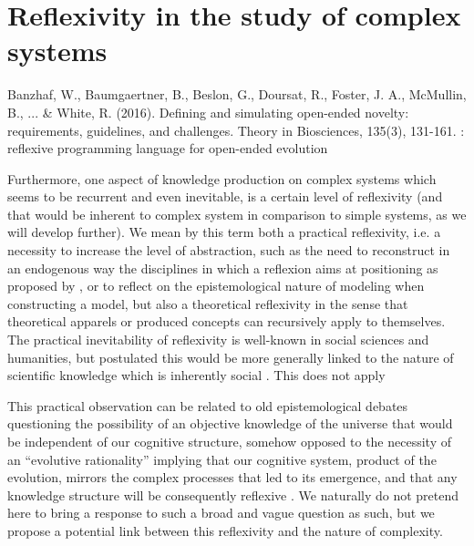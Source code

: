 


\section{Reflexivity in the study of complex systems}


Banzhaf, W., Baumgaertner, B., Beslon, G., Doursat, R., Foster, J. A., McMullin, B., ... & White, R. (2016). Defining and simulating open-ended novelty: requirements, guidelines, and challenges. Theory in Biosciences, 135(3), 131-161. : reflexive programming language for open-ended evolution


Furthermore, one aspect of knowledge production on complex systems which seems to be recurrent and even inevitable, is a certain level of reflexivity (and that would be inherent to complex system in comparison to simple systems, as we will develop further). We mean by this term both a practical reflexivity, i.e. a necessity to increase the level of abstraction, such as the need to reconstruct in an endogenous way the disciplines in which a reflexion aims at positioning as proposed by \cite{2017arXiv171200805R}, or to reflect on the epistemological nature of modeling when constructing a model, but also a theoretical reflexivity in the sense that theoretical apparels or produced concepts can recursively apply to themselves. The practical inevitability of reflexivity is well-known in social sciences and humanities, but \cite{bourdieu2004science} postulated this would be more generally linked to the nature of scientific knowledge which is inherently social \cite{maton2003reflexivity}. %
This does not apply

This practical observation can be related to old epistemological debates questioning the possibility of an objective knowledge of the universe that would be independent of our cognitive structure, somehow opposed to the necessity of an ``evolutive rationality'' implying that our cognitive system, product of the evolution, mirrors the complex processes that led to its emergence, and that any knowledge structure will be consequently reflexive
. We naturally do not pretend here to bring a response to such a broad and vague question as such, but we propose a potential link between this reflexivity and the nature of complexity. 







